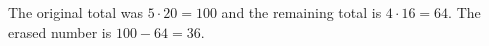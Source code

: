 The original total was $5\cdot20=100$ and the remaining total is $4\cdot16=64$. The erased number is $100-64=\boxed{36}$.
